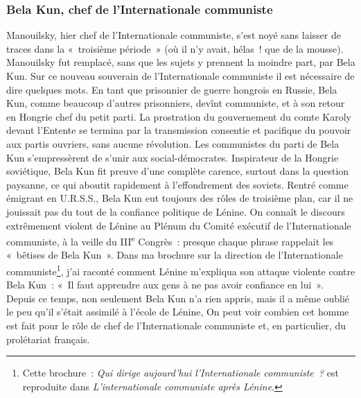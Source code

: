 \documentclass[french,twoside]{book} %
\begin{document}
 \subsubsection[{Bela Kun, chef de l’Internationale communiste}]{Bela Kun, chef de l’Internationale communiste}
\noindent Manouilsky, hier chef de l’Internationale communiste, s’est noyé sans laisser de traces dans la « troisième période » (où il n’y avait, hélas ! que de la mousse). Manouilsky fut remplacé, sans que les sujets y prennent la moindre part, par Bela Kun. Sur ce nouveau souverain de l’Internationale communiste il est nécessaire de dire quelques mots. En tant que prisonnier de guerre hongrois en Russie, Bela Kun, comme beaucoup d’autres prisonniers, devînt communiste, et à son retour en Hongrie chef du petit parti. La prostration du gouvernement du comte Karoly devant l’Entente se termina par la transmission consentie et pacifique du pouvoir aux partis ouvriers, sans aucune révolution. Les communistes du parti de Bela Kun s’empressèrent de s’unir aux social-démocrates. Inspirateur de la Hongrie soviétique, Bela Kun fit preuve d’une complète carence, surtout dans la question paysanne, ce qui aboutit rapidement à l’effondrement des soviets. Rentré comme émigrant en U.R.S.S., Bela Kun eut toujours des rôles de troisième plan, car il ne jouissait pas du tout de la confiance politique de Lénine. On connaît le discours extrêmement violent de Lénine au Plénum du Comité exécutif de l’Internationale communiste, à la veille du III\textsuperscript{e} Congrès : presque chaque phrase rappelait les « bêtises de Bela Kun ». Dans ma brochure sur la direction de l’Internationale communiste\footnote{ \noindent Cette brochure : \emph{Qui dirige aujourd’hui l’Internationale communiste ?} est reproduite dans \emph{L’internationale communiste après Lénine}.
 }, j’ai raconté comment Lénine m’expliqua son attaque violente contre Bela Kun : « Il faut apprendre aux gens à ne pas avoir confiance en lui ». Depuis ce temps, non seulement Bela Kun n’a rien appris, mais il a même oublié le peu qu’il s’était  assimilé à l’école de Lénine, On peut voir combien cet homme est fait pour le rôle de chef de l’Internationale communiste et, en particulier, du prolétariat français.
\end{document}

